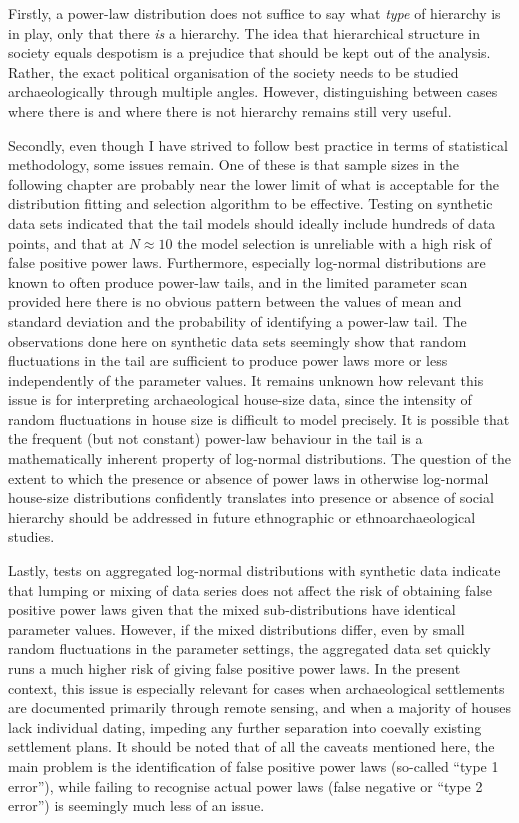 \documentclass[
  12pt,
]{book}
\begin{document}
Firstly, a power-law distribution does not suffice to say what \emph{type} of hierarchy is in play, only that there \emph{is} a hierarchy. The idea that hierarchical structure in society equals despotism is a prejudice that should be kept out of the analysis. Rather, the exact political organisation of the society needs to be studied archaeologically through multiple angles. However, distinguishing between cases where there is and where there is not hierarchy remains still very useful.

Secondly, even though I have strived to follow best practice in terms of statistical methodology, some issues remain. One of these is that sample sizes in the following chapter are probably near the lower limit of what is acceptable for the distribution fitting and selection algorithm to be effective. Testing on synthetic data sets indicated that the tail models should ideally include hundreds of data points, and that at \(N \approx 10\) the model selection is unreliable with a high risk of false positive power laws. Furthermore, especially log-normal distributions are known to often produce power-law tails, and in the limited parameter scan provided here there is no obvious pattern between the values of mean and standard deviation and the probability of identifying a power-law tail. The observations done here on synthetic data sets seemingly show that random fluctuations in the tail are sufficient to produce power laws more or less independently of the parameter values. It remains unknown how relevant this issue is for interpreting archaeological house-size data, since the intensity of random fluctuations in house size is difficult to model precisely. It is possible that the frequent (but not constant) power-law behaviour in the tail is a mathematically inherent property of log-normal distributions. The question of the extent to which the presence or absence of power laws in otherwise log-normal house-size distributions confidently translates into presence or absence of social hierarchy should be addressed in future ethnographic or ethnoarchaeological studies.

Lastly, tests on aggregated log-normal distributions with synthetic data indicate that lumping or mixing of data series does not affect the risk of obtaining false positive power laws given that the mixed sub-distributions have identical parameter values. However, if the mixed distributions differ, even by small random fluctuations in the parameter settings, the aggregated data set quickly runs a much higher risk of giving false positive power laws. In the present context, this issue is especially relevant for cases when archaeological settlements are documented primarily through remote sensing, and when a majority of houses lack individual dating, impeding any further separation into coevally existing settlement plans. It should be noted that of all the caveats mentioned here, the main problem is the identification of false positive power laws (so-called ``type 1 error''), while failing to recognise actual power laws (false negative or ``type 2 error'') is seemingly much less of an issue.
\end{document}
